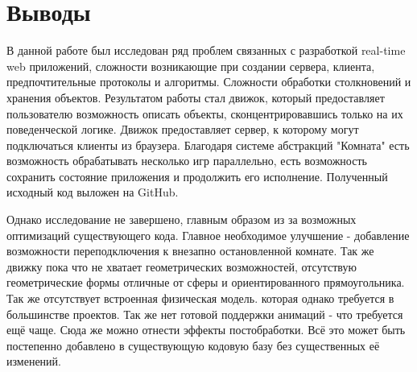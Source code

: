 \documentclass[a4paper,14pt, openany]{book}
\begin{document}
\chapter{Выводы}

В данной работе был исследован ряд проблем связанных с разработкой real-time web приложений, сложности возникающие при создании сервера, клиента, предпочтительные протоколы и алгоритмы. Сложности обработки столкновений и хранения объектов. Результатом работы стал движок, который предоставляет пользователю возможность описать объекты, сконцентрировавшись только на их поведенческой логике. Движок предоставляет сервер, к которому могут подключаться клиенты из браузера. Благодаря системе абстракций "Комната" есть возможность обрабатывать несколько игр параллельно, есть возможность сохранить состояние приложения и продолжить его исполнение. Полученный исходный код выложен на GitHub.

Однако исследование не завершено, главным образом из за возможных оптимизаций существующего кода. Главное необходимое улучшение - добавление возможности переподключения к внезапно остановленной комнате. Так же движку пока что не хватает геометрических возможностей, отсутствую геометрические формы отличные от сферы и ориентированного прямоугольника. Так же отсутствует встроенная физическая модель. которая однако требуется в большинстве проектов. Так же нет готовой поддержки анимаций - что требуется ещё чаще. Сюда же можно отнести эффекты постобработки. Всё это может быть постепенно добавлено в существующую кодовую базу без существенных её изменений.




\end{document}
